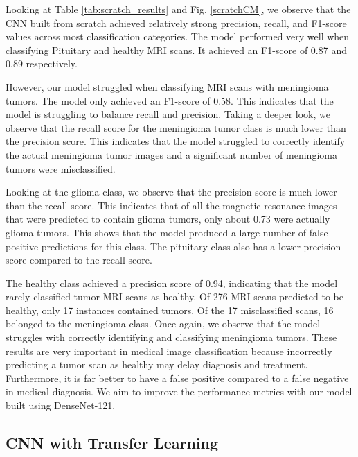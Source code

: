 \documentclass[conference]{IEEEtran}
\begin{document}
Looking at Table \ref{tab:scratch_results} and Fig. \ref{scratchCM}, we observe that the CNN built from scratch achieved relatively strong precision, recall, and F1-score values across most classification categories. The model performed very well when classifying Pituitary and healthy MRI scans. It achieved an F1-score of 0.87 and 0.89 respectively. 

However, our model struggled when classifying MRI scans with meningioma tumors. The model only achieved an F1-score of 0.58. This indicates that the model is struggling to balance recall and precision. Taking a deeper look, we observe that the recall score for the meningioma tumor class is much lower than the precision score. This indicates that the model struggled to correctly identify the actual meningioma tumor images and a significant number of meningioma tumors were misclassified.

Looking at the glioma class, we observe that the precision score is much lower than the recall score. This indicates that of all the magnetic resonance images that were predicted to contain glioma tumors, only about 0.73 were actually glioma tumors. This shows that the model produced a large number of false positive predictions for this class. The pituitary class also has a lower precision score compared to the recall score. 

The healthy class achieved a precision score of 0.94, indicating that the model rarely classified tumor MRI scans as healthy. Of 276 MRI scans predicted to be healthy, only 17 instances contained tumors. Of the 17 misclassified scans, 16 belonged to the meningioma class. Once again, we observe that the model struggles with correctly identifying and classifying meningioma tumors. These results are very important in medical image classification because incorrectly predicting a tumor scan as healthy may delay diagnosis and treatment. Furthermore, it is far better to have a false positive compared to a false negative in medical diagnosis. We aim to improve the performance metrics with our model built using DenseNet-121.

\subsection{CNN with Transfer Learning}
\end{document}
